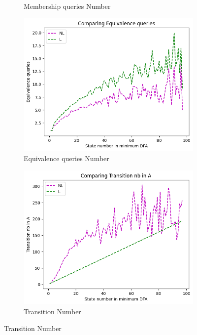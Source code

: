 \begin{figure}[!htb]
\begin{subfigure}[b]{0.25\textwidth}
    \caption{Membership queries Number}
    \label{fig:MemberBenchMarkCompare}
  \end{subfigure}
  \begin{subfigure}[b]{0.25\textwidth}
    \includegraphics[width=\textwidth]{../statistics/plots/BenchMark/Equivalence queries.png}
    \caption{Equivalence queries Number}
    \label{fig:EquivBenchMarkCompare}
  \end{subfigure}
  \begin{subfigure}[b]{0.25\textwidth}
    \includegraphics[width=\textwidth]{../statistics/plots/BenchMark/Transition nb in A.png}
    \caption{Transition Number}
    \label{fig:TransitionBenchMarkCompare}

\end{subfigure}
\end{figure}
